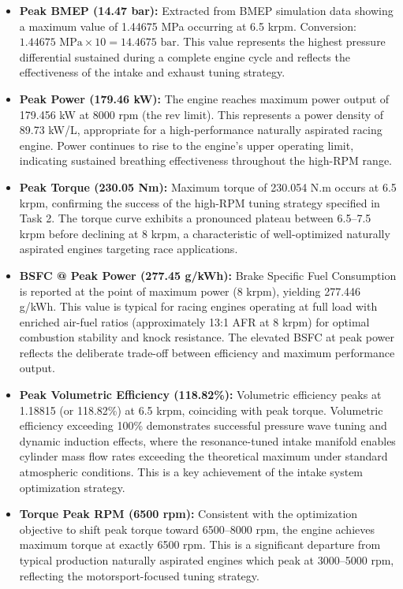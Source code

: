 \begin{itemize}
\item \textbf{Peak BMEP (14.47 bar):} Extracted from BMEP simulation data showing a maximum value of 1.44675 MPa occurring at 6.5 krpm. Conversion: $1.44675 \text{ MPa} \times 10 = 14.4675 \text{ bar}$. This value represents the highest pressure differential sustained during a complete engine cycle and reflects the effectiveness of the intake and exhaust tuning strategy.

\item\textbf{Peak Power (179.46 kW):} The engine reaches maximum power output of 179.456 kW at 8000 rpm (the rev limit). This represents a power density of 89.73 kW/L, appropriate for a high-performance naturally aspirated racing engine. Power continues to rise to the engine's upper operating limit, indicating sustained breathing effectiveness throughout the high-RPM range.

\item\textbf{Peak Torque (230.05 Nm):} Maximum torque of 230.054 N.m occurs at 6.5 krpm, confirming the success of the high-RPM tuning strategy specified in Task 2. The torque curve exhibits a pronounced plateau between 6.5--7.5 krpm before declining at 8 krpm, a characteristic of well-optimized naturally aspirated engines targeting race applications.

\item\textbf{BSFC @ Peak Power (277.45 g/kWh):} Brake Specific Fuel Consumption is reported at the point of maximum power (8 krpm), yielding 277.446 g/kWh. This value is typical for racing engines operating at full load with enriched air-fuel ratios (approximately 13:1 AFR at 8 krpm) for optimal combustion stability and knock resistance. The elevated BSFC at peak power reflects the deliberate trade-off between efficiency and maximum performance output.

\item\textbf{Peak Volumetric Efficiency (118.82\%):} Volumetric efficiency peaks at 1.18815 (or 118.82\%) at 6.5 krpm, coinciding with peak torque. Volumetric efficiency exceeding 100\% demonstrates successful pressure wave tuning and dynamic induction effects, where the resonance-tuned intake manifold enables cylinder mass flow rates exceeding the theoretical maximum under standard atmospheric conditions. This is a key achievement of the intake system optimization strategy.

\item\textbf{Torque Peak RPM (6500 rpm):} Consistent with the optimization objective to shift peak torque toward 6500--8000 rpm, the engine achieves maximum torque at exactly 6500 rpm. This is a significant departure from typical production naturally aspirated engines which peak at 3000--5000 rpm, reflecting the motorsport-focused tuning strategy.


\end{itemize}
